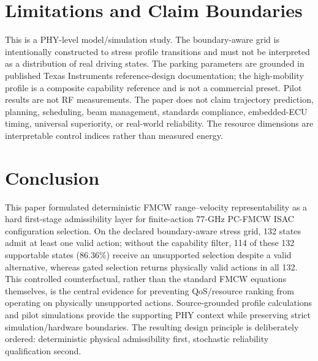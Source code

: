\documentclass[journal]{IEEEtran}
\begin{document}
\section{Limitations and Claim Boundaries}
This is a PHY-level model/simulation study. The boundary-aware grid is intentionally constructed to stress profile transitions and must not be interpreted as a distribution of real driving states. The parking parameters are grounded in published Texas Instruments reference-design documentation; the high-mobility profile is a composite capability reference and is not a commercial preset. Pilot results are not RF measurements. The paper does not claim trajectory prediction, planning, scheduling, beam management, standards compliance, embedded-ECU timing, universal superiority, or real-world reliability. The resource dimensions are interpretable control indices rather than measured energy.

\section{Conclusion}
This paper formulated deterministic FMCW range--velocity representability as a hard first-stage admissibility layer for finite-action 77-GHz PC-FMCW ISAC configuration selection. On the declared boundary-aware stress grid, 132 states admit at least one valid action; without the capability filter, 114 of these 132 supportable states (86.36\%) receive an unsupported selection despite a valid alternative, whereas gated selection returns physically valid actions in all 132. This controlled counterfactual, rather than the standard FMCW equations themselves, is the central evidence for preventing QoS/resource ranking from operating on physically unsupported actions. Source-grounded profile calculations and pilot simulations provide the supporting PHY context while preserving strict simulation/hardware boundaries. The resulting design principle is deliberately ordered: deterministic physical admissibility first, stochastic reliability qualification second.



\end{document}
